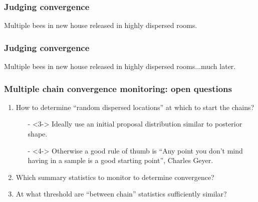 \documentclass[handout]{beamer}
\begin{document}
\begin{frame}
	\frametitle{Judging convergence}
	Multiple bees in new house released in highly dispersed rooms.
	
	\begin{figure}[t]
		\centerline{}
	\end{figure}
	
\end{frame}

\begin{frame}
	\frametitle{Judging convergence}
	Multiple bees in new house released in highly dispersed rooms...much later.
	
	\begin{figure}[t]
		\centerline{}
	\end{figure}
	
	
\end{frame}


\begin{frame}
\frametitle{Multiple chain convergence monitoring: open questions}

\begin{enumerate}
\item<2-> How to determine ``random dispersed locations'' at which to start the chains?
\begin{itemize}
\item[-]<3-> Ideally use an initial proposal distribution similar to posterior shape.
\item[-]<4-> Otherwise a good rule of thumb is ``Any point you don’t mind having in
a sample is a good starting point'', Charles Geyer.
\end{itemize}
\item<5-> Which summary statistics to monitor to determine convergence?
\item<6-> At what threshold are ``between chain'' statistics sufficiently similar?
\end{enumerate}

\end{frame}
\end{document}
